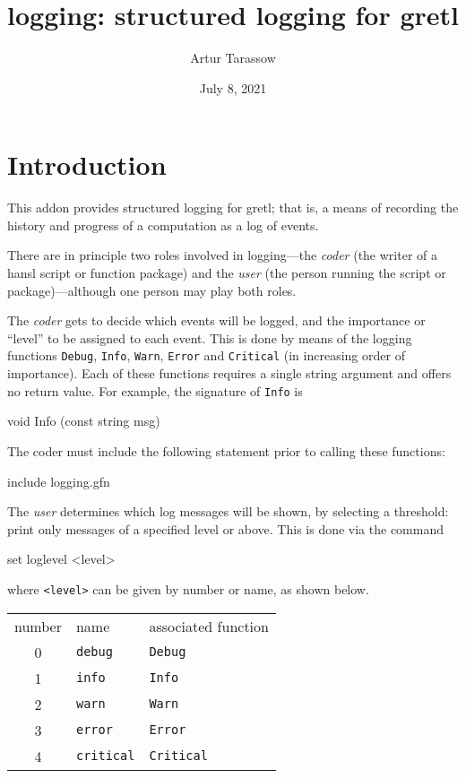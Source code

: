 \documentclass{article}
\begin{document}
\setlength{\parindent}{0pt}
\setlength{\parskip}{1ex}

\newcommand{\argname}[1]{\textsl{#1}}

\title{\textsf{logging}: structured logging for gretl}
\author{Artur Tarassow}
\date{July 8, 2021}
\maketitle

\section{Introduction}

This addon provides structured logging for gretl; that is, a means of
recording the history and progress of a computation as a log of
events.

There are in principle two roles involved in logging---the
\textit{coder} (the writer of a hansl script or function package) and
the \textit{user} (the person running the script or
package)---although one person may play both roles.

The \textit{coder} gets to decide which events will be logged, and the
importance or ``level'' to be assigned to each event. This is done by
means of the logging functions \texttt{Debug}, \texttt{Info},
\texttt{Warn}, \texttt{Error} and \texttt{Critical} (in increasing
order of importance).  Each of these functions requires a single
string argument and offers no return value. For example, the signature
of \texttt{Info} is
\begin{code}
void Info (const string msg)
\end{code}
The coder must include the following statement prior to calling these
functions:
\begin{code}
include logging.gfn
\end{code}

The \textit{user} determines which log messages will be shown, by
selecting a threshold: print only messages of a specified level or
above.  This is done via the command
\begin{code}
set loglevel <level>
\end{code}
where \verb|<level>| can be given by number or name, as shown below.

\begin{center}
  \begin{tabular}{cll}
    number & name & associated function \\[4pt]
    0 & \texttt{debug} & \texttt{Debug}\\
    1 & \texttt{info} & \texttt{Info}\\
    2 & \texttt{warn} & \texttt{Warn}\\
    3 & \texttt{error} & \texttt{Error}\\
    4 & \texttt{critical} & \texttt{Critical}
  \end{tabular}
\end{center}
\end{document}
